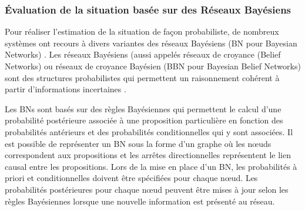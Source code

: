 \documentclass[a4paper,11pt,twoside]{StyleThese}
\begin{document}
\subsubsection{Évaluation de la situation basée sur des Réseaux Bayésiens}

Pour réaliser l'estimation de la situation de façon probabiliste, de nombreux systèmes ont recours à divers
variantes des réseaux Bayésiens (BN pour Bayesian Networks) \cite{bladon2002situation,das2002situation,higgins2005automatic}.
Les réseaux Bayésiens (aussi appelés réseaux de croyance (Belief Networks) ou réseaux de croyance Bayésien (BBN pour Bayesian Belief Networks) sont des structures probabilistes qui permettent un raisonnement cohérent à partir d'informations incertaines \cite{pearl1986fusion}.

Les BNs sont basés sur des règles Bayésiennes qui permettent le calcul d'une probabilité postérieure associée à une proposition particulière
en fonction des probabilités antérieurs et des probabilités conditionnelles qui y sont associées.
Il est possible de représenter un BN sous la forme d'un graphe où les nœuds correspondent aux propositions et
les arrêtes directionnelles représentent le lien causal entre les propositions.
Lors de la mise en place d'un BN, les probabilités à priori et conditionnelles doivent être spécifiées pour
chaque nœud. Les probabilités postérieures pour chaque nœud peuvent être mises à jour selon les règles Bayésiennes lorsque
une nouvelle information est présenté au réseau.

\end{document}
